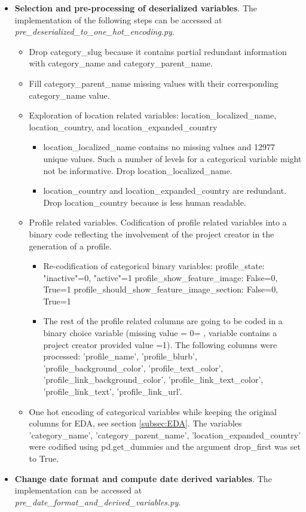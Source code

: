 \documentclass{article}
\begin{document}
{\begin{itemize}
    \item \textbf{Selection and pre-processing of deserialized variables}.
    The implementation of the following steps can be accessed at \emph{pre\_deserialized\_to\_one\_hot\_encoding.py}.
    \begin{itemize}
 
        \item Drop category\_slug because it contains partial redundant information with category\_name and category\_parent\_name.
        \item Fill category\_parent\_name missing values with their corresponding category\_name value.
        \item Exploration of location related variables: location\_localized\_name, location\_country, and location\_expanded\_country
	\begin{itemize}
            \item location\_localized\_name contains no missing values and 12977 unique values. Such a number of levels for a categorical variable might not be informative. Drop location\_localized\_name.
            \item location\_country and location\_expanded\_country are redundant. Drop location\_country because is less human readable.
	\end{itemize}
	\item Profile related variables. Codification of profile related variables into a binary code reflecting the involvement of the project creator in the generation of a profile.
	\begin{itemize}
            \item Re-codification of categorical binary variables:
	    profile\_state: "inactive"=0, "active"=1
            profile\_show\_feature\_image: False=0, True=1
            profile\_should\_show\_feature\_image\_section: False=0, True=1

            \item The rest of the profile related columns are going to be coded in a binary choice variable (missing value = 0= , variable contains a project creator provided value =1). The following columns were processed: 'profile\_name', 'profile\_blurb', 'profile\_background\_color', 'profile\_text\_color', 'profile\_link\_background\_color', 'profile\_link\_text\_color', 'profile\_link\_text', 'profile\_link\_url'.
        \end{itemize}
	\item One hot encoding of categorical variables while keeping the original columns for EDA, see section \ref{subsec:EDA}.
        The variables 'category\_name', 'category\_parent\_name', 'location\_expanded\_country' were codified using pd.get\_dummies and the argument drop\_first was set to True.
   \end{itemize}
   \item \textbf{Change date format and compute date derived variables}.
    The implementation can be accessed at \emph{pre\_date\_format\_and\_derived\_variables.py}.
    

\end{itemize}}
\end{document}
